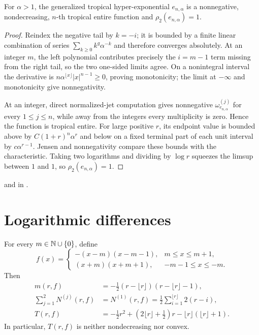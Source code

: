 \begin{proposition}
\leanok
{}
For $\alpha>1$, the generalized tropical hyper-exponential $e_{n,\alpha}$ is
a nonnegative, nondecreasing, $n$-th tropical entire function and
$\rho_2(e_{n,\alpha})=1$.
\end{proposition}

\begin{proof}
\leanok
Reindex the negative tail by $k=-i$; it is bounded by a finite linear
combination of series $\sum_{k\geq0}k^q\alpha^{-k}$ and therefore converges
absolutely.  At an integer $m$, the left polynomial contributes precisely
the $i=m-1$ term missing from the right tail, so the two one-sided limits
agree.  On a nonintegral interval the derivative is
$n\alpha^{\lfloor x\rfloor}|x|^{n-1}\geq0$, proving monotonicity; the limit at
$-\infty$ and monotonicity give nonnegativity.

At an integer, direct normalized-jet computation gives nonnegative
$\omega_{e_{n,\alpha}}^{(j)}$ for every $1\leq j\leq n$, while away from the
integers every multiplicity is zero.  Hence the function is tropical entire.
For large positive $r$, its endpoint value is bounded above by
$C(1+r)^n\alpha^r$ and below on a fixed terminal part of each unit interval
by $c\alpha^{r-1}$.  Jensen and nonnegativity compare these bounds with the
characteristic.  Taking two logarithms and dividing by $\log r$ squeezes the
limsup between $1$ and $1$, so $\rho_2(e_{n,\alpha})=1$.
\end{proof}

\begin{leanproof}
 and  in
.
\end{leanproof}

\section{Logarithmic differences}

\begin{example}
\leanok
{}
For every $m\in\mathbb N\cup\{0\}$, define
\[
 f(x)=\begin{cases}
 -(x-m)(x-m-1),&m\leq x\leq m+1,\\
 (x+m)(x+m+1),&-m-1\leq x\leq-m.
 \end{cases}
\]
Then
\begin{align*}
 m(r,f)&=-\frac12(r-\lfloor r\rfloor)(r-\lfloor r\rfloor-1),\\
 \sum_{j=1}^2N^{(j)}(r,f)&=N^{(1)}(r,f)
   =\frac12\sum_{i=1}^{\lfloor r\rfloor}2(r-i),\\
 T(r,f)&=-\frac12r^2+\left(2\lfloor r\rfloor+\frac12\right)r
          -\lfloor r\rfloor(\lfloor r\rfloor+1).
\end{align*}
In particular, $T(r,f)$ is neither nondecreasing nor convex.
\end{example}

